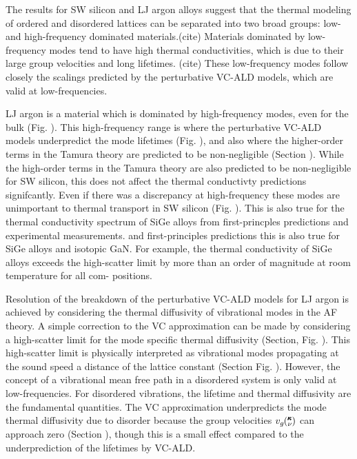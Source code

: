 \documentclass[aps,prb,twocolumn,superscriptaddress,amsmath,amssymb,floatfix]{revtex4}
\newcommand{\kv}{\mspace{-4.0mu}\left(\mspace{-8.0mu}
\begin{smallmatrix}&\pmb{\kappa} \\&\nu\end{smallmatrix}
\mspace{-3.0mu}\right)}
\begin{document}
The results for SW silicon and LJ argon alloys suggest that 
the thermal modeling of ordered and 
disordered lattices can be separated into two broad groups: 
low- and high-frequency dominated materials.(cite) Materials dominated 
by low-frequency modes tend to have high thermal conductivities, 
which is due to their large group velocities and long lifetimes.
(cite) These low-frequency modes  
follow closely the scalings predicted by the perturbative VC-ALD 
models, which are valid at low-frequencies. 

LJ argon is a material 
which is dominated by high-frequency modes, even for the bulk (Fig. ). 
This high-frequency range is where the perturbative VC-ALD models 
underpredict the mode lifetimes (Fig. ), and also where the higher-order 
terms in the Tamura theory are predicted to be non-negligible (Section ). 
While the 
high-order terms in the Tamura theory are also predicted to be 
non-negligible for SW silicon, this does not affect the thermal 
conductivty predictions signifcantly. Even if there was a discrepancy 
at high-frequency these modes 
are unimportant to thermal transport in SW silicon (Fig. ). This is also 
true for the thermal conductivity spectrum of SiGe alloys 
from first-princples predictions\cite{garg_role_2011} and experimental 
measurements.\cite{abeles_thermal_1962,cahill_thermal_2004,
cahill_thermal_2005,cheaito_experimental_2012} 
and first-principles predictions\cite{garg_role_2011,lindsay_thermal_2012} 
this is also true for SiGe alloys and isotopic GaN.
\cite{} 
For example, the thermal conductivity of SiGe alloys
exceeds the high-scatter limit by more than
an order of magnitude at room temperature for all com-
positions.

Resolution 
of the breakdown of the perturbative VC-ALD models for LJ argon 
is achieved by considering the thermal diffusivity of vibrational 
modes in the AF theory. 
A simple correction to the VC approximation can be made by considering 
a high-scatter limit for the mode specific thermal 
diffusivity (Section, Fig. ). 
This high-scatter limit is physically interpreted as vibrational modes 
propagating at the sound speed a distance of the lattice constant 
(Section Fig. ). However, the concept of a vibrational mean free path 
in a disordered system is only valid at low-frequencies.
\cite{feldman_numerical_1999,xu_energy_2009} For 
disordered vibrations, the lifetime and thermal diffusivity are the 
fundamental quantities. The VC approximation underpredicts 
the mode thermal 
diffusivity due to disorder because the group velocities $v_g\kv$ can 
approach zero (Section ), though this is a small effect compared to 
the underprediction of the lifetimes by VC-ALD. 
\end{document}
